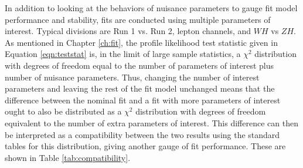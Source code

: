 In addition to looking at the behaviors of nuisance parameters to gauge fit model performance and stability, fits are conducted using multiple parameters of interest.  Typical divisions are Run 1 vs. Run 2, lepton channels, and $WH$ vs $ZH$.  As mentioned in Chapter \ref{ch:fit}, the profile likelihood test statistic given in Equation \ref{eqn:teststat} is, in the limit of large sample statistics, a $\chi^2$ distribution with degrees of freedom equal to the number of parameters of interest plus number of nuisance parameters.  Thus, changing the number of interest parameters and leaving the rest of the fit model unchanged means that the difference between the nominal fit and a fit with more parameters of interest ought to also be distributed as a $\chi^2$ distribution with degrees of freedom equivalent to the number of extra parameters of interest.  This difference can then be interpreted as a compatibility between the two results using the standard tables for this distribution, giving another gauge of fit performance.  These are shown in Table \ref{tab:compatibility}.

